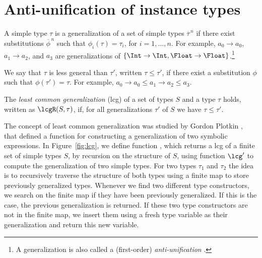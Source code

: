 \section{Anti-unification of instance types}
\label{sec:anti-unif}

A simple type $\tau$ is a generalization of a set of simple types
$\overline{\tau}^{\,n}$ if there exist substitutions
$\overline{\phi}^{\,n}$ such that $\phi_i(\tau)=\tau_i$, for
$i=1,\ldots,n$. For example, $a_0 \rightarrow a_0$,
$a_1 \rightarrow a_2$, and $a_3$ are generalizations of
$\{ \Int \rightarrow \Int, \Float \rightarrow \Float\}$.\footnote{A generalization is also called a (first-order) {\em
  anti-unification\/} \cite{ModelTheory2012}.}

We say that $\tau$ is less general than $\tau'$, written $\tau \leq
\tau'$, if there exist a substitution $\phi$ such that $\phi(\tau') = \tau$.  For
example, $a_0 \rightarrow a_0 \leq a_1 \rightarrow
a_2 \leq a_3$.

The {\it least common generalization} (lcg) of a set of types
$S$ and a type $\tau$ holds, written as $\lcgR(S,\tau)$, if, for all generalizations $\tau'$ of
$S$ we have $\tau \leq \tau'$.

The concept of least common generalization was studied by Gordon
Plotkin \cite{plotkin1970note,plotkin1971further}, that defined a
function for constructing a generalization of two symbolic
expressions.  In Figure~\ref{fig:lcg}, we define function \lcg, which
returns a lcg of a finite set of simple types $S$, by recursion on the
structure of $S$, using function $\lcg'$ to compute the generalization
of two simple types. For two types $\tau_1$ and $\tau_2$ the idea is
to recursively traverse the structure of both types using a finite map
to store previously generalized types. Whenever we find two different
type constructors, we search on the finite map if they have been
previously generalized. If this is the case, the previous
generalization is returned. If these two type constructors are not in
the finite map, we insert them using a fresh type variable as their
generalization and return this new variable.

